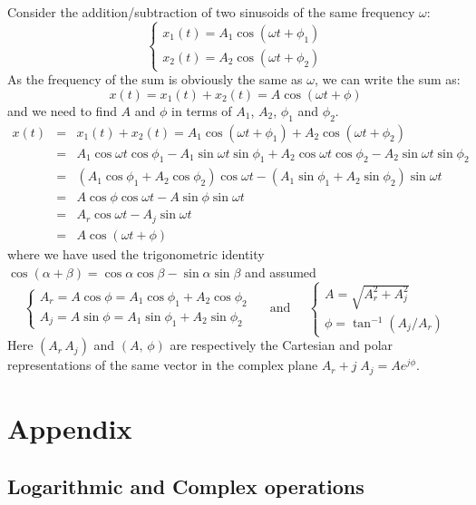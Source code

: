 Consider the addition/subtraction of two sinusoids of the same frequency 
$\omega$:
\[ \left\{ \begin{array}{l} x_1(t)=A_1\cos(\omega t+\phi_1)\\
  x_2(t)=A_2\cos(\omega t+\phi_2) \end{array} \right. \]
As the frequency of the sum is obviously the same as $\omega$, we can write
the sum as:
\[ x(t)=x_1(t)+x_2(t)=A\cos(\omega t+\phi) \]
and we need to find $A$ and $\phi$ in terms of $A_1$, $A_2$, $\phi_1$ and 
$\phi_2$.
\begin{eqnarray}
  x(t)&=&x_1(t)+x_2(t)=A_1\cos(\omega t+\phi_1)+A_2\cos(\omega t+\phi_2)
  \nonumber \\
  &=&A_1\cos\omega t\cos\phi_1-A_1\sin\omega t\sin\phi_1
  +A_2\cos\omega t\cos\phi_2-A_2\sin\omega t\sin\phi_2
  \nonumber \\
  &=&(A_1\cos\phi_1+A_2\cos\phi_2)\cos\omega t
  -(A_1\sin\phi_1+A_2\sin\phi_2)\sin\omega t
  \nonumber \\
  &=&A\cos\phi\cos\omega t-A\sin\phi\sin\omega t
  \nonumber \\
  &=&A_r\cos\omega t-A_j\sin\omega t
  \nonumber \\
  &=&A \cos(\omega t+\phi) 
  \nonumber
\end{eqnarray}
where we have used the trigonometric identity 
$\cos(\alpha+\beta)=\cos\alpha\cos\beta-\sin\alpha\sin\beta$
and assumed
\[ 
\left\{ \begin{array}{l} A_r=A\cos\phi =A_1 \cos\phi_1+A_2 \cos\phi_2\\
  A_j=A\sin\phi =A_1\sin\phi_1+A_2\sin\phi_2\end{array} \right. 
\;\;\;\;\;\mbox{and}\;\;\;\;\;
\left\{ \begin{array}{l} A=\sqrt{A^2_r+A^2_j}\\
  \phi=\tan^{-1} (A_j/A_r) \end{array} \right. 
\]
Here $(A_r\,A_j)$ and $(A,\,\phi)$ are respectively the Cartesian and polar 
representations of the same vector in the complex plane $A_r+j\;A_j=A e^{j\phi}$.



\section*{Appendix}

\subsection*{Logarithmic and Complex operations}

